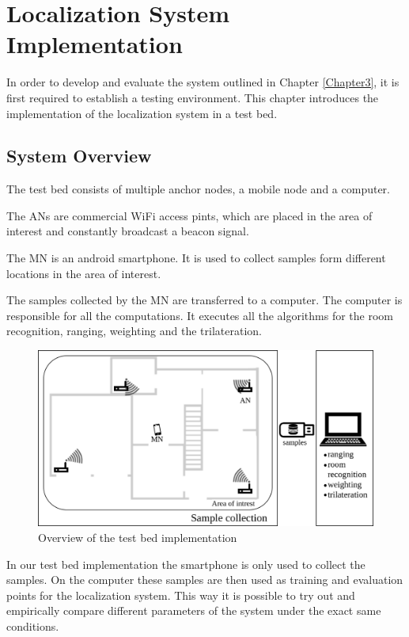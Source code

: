 \chapter{Localization System Implementation}

\label{Chapter4}

In order to develop and evaluate the system outlined in Chapter \ref{Chapter3}, it is first required to establish a testing environment.
This chapter introduces the implementation of the localization system in a test bed.

\section{System Overview}

The test bed consists of multiple anchor nodes, a mobile node and a computer.

The ANs are commercial WiFi access pints, which are placed in the area of interest and constantly broadcast a beacon signal.

The MN is an android smartphone. It is used to collect samples form different locations in the area of interest.

The samples collected by the MN are transferred to a computer. The computer is responsible for all the computations. It executes all the algorithms for the room recognition, ranging, weighting and the trilateration.

\begin{figure}[ht]
\centering
\includegraphics[width=\textwidth]{Figures/SystemImplementationOverview}
\decoRule
\caption[Test bed implementation overview]{Overview of the test bed implementation}
\label{fig:localizationSystemOverview}
\end{figure}

In our test bed implementation the smartphone is only used to collect the samples. On the computer these samples are then used as training and evaluation points for the localization system. This way it is possible to try out and empirically compare different parameters of the system under the exact same conditions.

